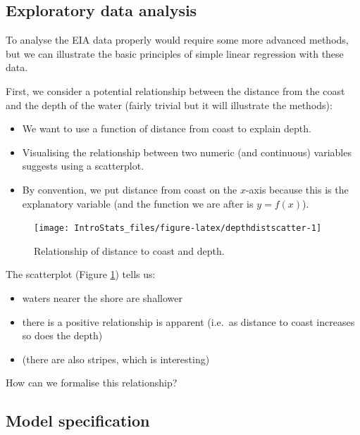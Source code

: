 \documentclass[
  oneside]{krantz}
\providecommand{\tightlist}{%
  \setlength{\itemsep}{0pt}\setlength{\parskip}{0pt}}
\begin{document}
\hypertarget{exploratory-data-analysis-1}{%
\subsection{Exploratory data analysis}\label{exploratory-data-analysis-1}}

To analyse the EIA data properly would require some more advanced methods, but we can illustrate the basic principles of simple linear regression with these data.

First, we consider a potential relationship between the distance from the coast and the depth of the water (fairly trivial but it will illustrate the methods):

\begin{itemize}
\tightlist
\item
  We want to use a function of distance from coast to explain depth.
\item
  Visualising the relationship between two numeric (and continuous) variables suggests using a scatterplot.
\item
  By convention, we put distance from coast on the \(x\)-axis because this is the explanatory variable (and the function we are after is \(y=f(x)\)).
\end{itemize}

\begin{figure}

{\centering \texttt{[image: IntroStats\_files/figure-latex/depthdistscatter-1]} 

}

\caption{Relationship of distance to coast and depth.}\label{fig:depthdistscatter}
\end{figure}

The scatterplot (Figure \ref{fig:depthdistscatter}) tells us:

\begin{itemize}
\tightlist
\item
  waters nearer the shore are shallower
\item
  there is a positive relationship is apparent (i.e.~as distance to coast increases so does the depth)
\item
  (there are also stripes, which is interesting)
\end{itemize}

How can we formalise this relationship?

\hypertarget{model-specification}{%
\subsection{Model specification}\label{model-specification}}
\end{document}
